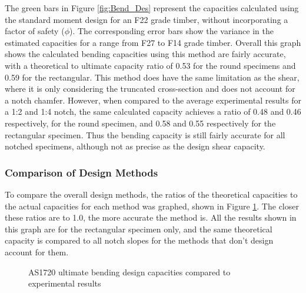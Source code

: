 \documentclass[11pt,a4paper]{article}
\numberwithin{equation}{subsection}
\begin{document}
\noindent
The green bars in Figure \ref{fig:Bend_Des} represent the capacities calculated using the standard moment design for an F22 grade timber, without incorporating a factor of safety ($\phi$). The corresponding error bars show the variance in the estimated capacities for a range from F27 to F14 grade timber. Overall this graph shows the calculated bending capacities using this method are fairly accurate, with a theoretical to ultimate capacity ratio of 0.53 for the round specimens and 0.59 for the rectangular. This method does have the same limitation as the shear, where it is only considering the truncated cross-section and does not account for a notch chamfer. However, when compared to the average experimental results for a 1:2 and 1:4 notch, the same calculated capacity achieves a ratio of 0.48 and 0.46 respectively, for the round specimen, and 0.58 and 0.55 respectively for the rectangular specimen. Thus the bending capacity is still fairly accurate for all notched specimens, although not as precise as the design shear capacity. 

\subsubsection{Comparison of Design Methods}
To compare the overall design methods, the ratios of the theoretical capacities to the actual capacities for each method was graphed, shown in Figure \ref{fig:Des_Comp}. The closer these ratios are to 1.0, the more accurate the method is. All the results shown in this graph are for the rectangular specimen only, and the same theoretical capacity is compared to all notch slopes for the methods that don't design account for them. 

\vspace*{\baselineskip}

\begin{figure}[h]
	\begin{center}
	\end{center}
	\caption{AS1720 ultimate bending design capacities compared to experimental results}
	\label{fig:Des_Comp}
\end{figure}
\end{document}

